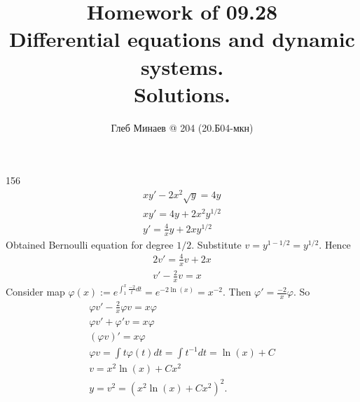 \documentclass[12pt,a4paper]{article}
\title{Homework of 09.28\\Differential equations and dynamic systems.\\Solutions.}
\author{Глеб Минаев @ 204 (20.Б04-мкн)}
\date{}
\begin{document}
    \maketitle

    \begin{problem}{156}
        \begin{gather*}
            xy' - 2x^2 \sqrt{y} = 4y\\
            xy' = 4y + 2x^2 y^{1/2}\\
            y' = \frac{4}{x} y + 2x y^{1/2}
        \end{gather*}
        Obtained Bernoulli equation for degree $1/2$. Substitute $v = y^{1 - 1/2} = y^{1/2}$. Hence
        \begin{gather*}
            2v' = \frac{4}{x} v + 2x\\
            v' - \frac{2}{x} v = x
        \end{gather*}
        Consider map $\varphi(x) := e^{\int_1^x \frac{-2}{t} dt} = e^{-2\ln(x)} = x^{-2}$. Then $\varphi' = \frac{-2}{x} \varphi$. So
        \begin{gather*}
            \varphi v' - \frac{2}{x} \varphi v = x \varphi\\
            \varphi v' + \varphi' v = x \varphi\\
            (\varphi v)' = x \varphi\\
            \varphi v = \int t \varphi(t) dt = \int t^{-1} dt = \ln(x) + C\\
            v = x^2 \ln(x) + C x^2\\
            y = v^2 = (x^2 \ln(x) + C x^2)^2.\\
        \end{gather*}
    \end{problem}
\end{document}
